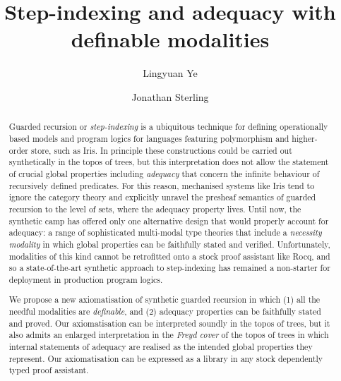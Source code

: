\documentclass[acmsmall,nonacm,screen]{acmart}
\title{Step-indexing and adequacy with definable modalities}
\author{Lingyuan Ye}
\affiliation{%
	\department{Computer Laboratory}
	\institution{University of Cambridge}
	\city{Cambridge}
	\country{United Kingdom}
}
\author{Jonathan Sterling}
\affiliation{%
	\department{Computer Laboratory}
	\institution{University of Cambridge}
	\city{Cambridge}
	\country{United Kingdom}
}
\theoremstyle{acmdefinition}
\begin{document}
\begin{abstract}
	Guarded recursion or \emph{step-indexing} is a ubiquitous technique for defining operationally based models and program logics for languages featuring polymorphism and higher-order store, such as Iris. In principle these constructions could be carried out synthetically in the topos of trees, but this interpretation does not allow the statement of crucial global properties including \emph{adequacy} that concern the infinite behaviour of recursively defined predicates. For this reason, mechanised systems like Iris tend to ignore the category theory and explicitly unravel the presheaf semantics of guarded recursion to the level of sets, where the adequacy property lives.
	Until now, the synthetic camp has offered only one alternative design that would properly account for adequacy: a range of sophisticated multi-modal type theories that include a \emph{necessity modality} in which global properties can be faithfully stated and verified. Unfortunately, modalities of this kind cannot be retrofitted onto a stock proof assistant like Rocq, and so a state-of-the-art synthetic approach to step-indexing has remained a non-starter for deployment in production program logics.
	
	We propose a new axiomatisation of synthetic guarded recursion in which (1) all the needful modalities are \emph{definable}, and (2) adequacy properties can be faithfully stated and proved. Our axiomatisation can be interpreted soundly in the topos of trees, but it also admits an enlarged interpretation in the \emph{Freyd cover} of the topos of trees in which internal statements of adequacy are realised as the intended global properties they represent. Our axiomatisation can be expressed as a library in any stock dependently typed proof assistant.
\end{abstract}

\maketitle





\end{document}
